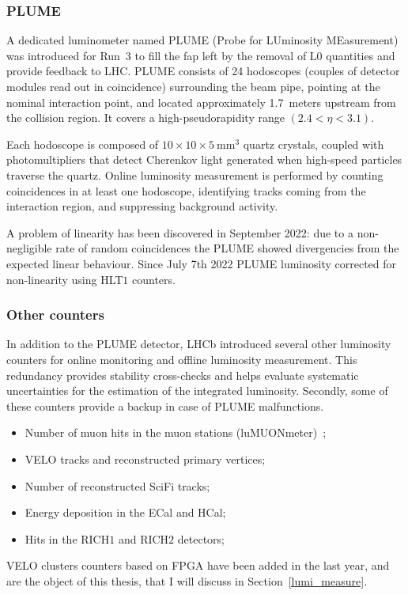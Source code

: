 \subsubsection{PLUME}
A dedicated luminometer named PLUME (Probe for LUminosity MEasurement) was introduced for Run~3 to fill the fap left by the removal of L$0$ quantities  and provide feedback to LHC. PLUME consists of 24 hodoscopes (couples of detector modules read out in coincidence) surrounding the beam pipe, pointing at the nominal interaction point, and located approximately 1.7~meters upstream from the collision region. It covers a high-pseudorapidity range $(2.4 < \eta < 3.1)$.

Each hodoscope is composed of $10 \times 10 \times \SI{5}{\milli\meter\tothe{3}}$ quartz crystals, coupled with photomultipliers that detect Cherenkov light generated when high-speed particles traverse the quartz. Online luminosity measurement is performed by counting coincidences in at least one hodoscope, identifying tracks coming from the interaction region, and suppressing background activity.

A problem of linearity has been discovered in September 2022: due to a non-negligible rate of random coincidences the PLUME showed divergencies from the expected linear behaviour. Since July 7th 2022 PLUME luminosity corrected for non-linearity using HLT$1$ counters.


\subsubsection{Other counters} 
In addition to the PLUME detector, LHCb introduced several other luminosity counters for online monitoring and offline luminosity measurement. This redundancy provides stability cross-checks and helps evaluate systematic uncertainties for the estimation of the integrated luminosity.
Secondly, some of these counters provide a backup in case of PLUME malfunctions.
\begin{itemize}
   \item Number of muon hits in the muon stations (luMUONmeter)~\cite{Albicocco:2812716};
   \item VELO tracks and reconstructed primary vertices;
   \item Number of reconstructed SciFi tracks;
   \item Energy deposition in the ECal and HCal;
    \item Hits in the RICH$1$ and RICH$2$ detectors;

\end{itemize}
 VELO clusters counters based on FPGA have been added in the last year, and are the object of this thesis, that I will discuss in Section~\ref{lumi_measure}.

